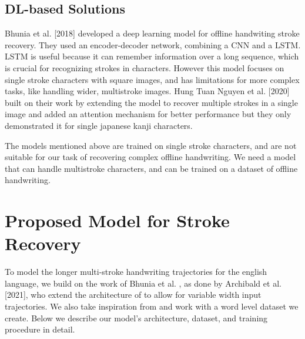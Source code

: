 \documentclass[10pt,twocolumn,letterpaper]{article}
\begin{document}
\subsection{DL-based Solutions}
Bhunia et al. \cite{image2stroke-1Char}[2018] developed a deep learning model for offline handwiting stroke recovery. They used an encoder-decoder network, combining a CNN and a LSTM. LSTM is useful because it can remember information over a long sequence, which is crucial for recognizing strokes in characters. However this model focuses on single stroke characters with square images, and has limitations for more complex tasks, like handling wider, multistroke images. Hung Tuan Nguyen et al. \cite{img2strk-japanese}[2020] built on their work by extending the model to recover multiple strokes in a single image and added an attention mechanism for better performance but they only demonstrated it for single japanese kanji characters.  

The models mentioned above are trained on single stroke characters, and are not suitable for our task of recovering complex offline handwriting. We need a model that can handle multistroke characters, and can be trained on a dataset of offline handwriting.

\section{Proposed Model for Stroke Recovery}

To model the longer multi-stroke handwriting trajectories for the english language, we build on the work of Bhunia et al. \cite{image2stroke-1Char}, as done by Archibald et al. \cite{image2stroke-Archibald}[2021], who extend the architecture of \cite{image2stroke-1Char} to allow for variable width input trajectories. We also take inspiration from \cite{img2stroke-multichar} and work with a word level dataset we create. Below we describe our model's architecture, dataset, and training procedure in detail.
\end{document}
